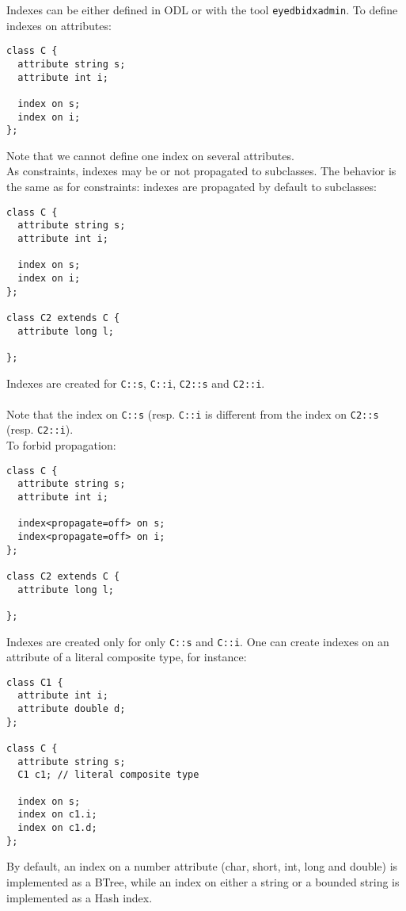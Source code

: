 Indexes can be either defined in ODL or with the tool \texttt{eyedbidxadmin}.
To define indexes on attributes:
\begin{verbatim}
class C {
  attribute string s;
  attribute int i;

  index on s;
  index on i;
};
\end{verbatim}
Note that we cannot define one index on several attributes.
\\
As constraints, indexes may be or not propagated to subclasses.
The behavior is the same as for constraints: indexes are propagated
by default to subclasses:
\begin{verbatim}
class C {
  attribute string s;
  attribute int i;

  index on s;
  index on i;
};

class C2 extends C {
  attribute long l;
  
};
\end{verbatim}
Indexes are created for \texttt{C::s}, \texttt{C::i}, \texttt{C2::s}
and \texttt{C2::i}.
\\
\\
Note that the index on \texttt{C::s} (resp. \texttt{C::i} is different from the
index on \texttt{C2::s} (resp. \texttt{C2::i}).
\\
To forbid propagation:
\begin{verbatim}
class C {
  attribute string s;
  attribute int i;

  index<propagate=off> on s;
  index<propagate=off> on i;
};

class C2 extends C {
  attribute long l;
  
};
\end{verbatim}
Indexes are created only for only \texttt{C::s} and \texttt{C::i}.
One can create indexes on an attribute of a literal composite type, for
instance:
\begin{verbatim}
class C1 {
  attribute int i;
  attribute double d;
};

class C {
  attribute string s;
  C1 c1; // literal composite type

  index on s;
  index on c1.i;
  index on c1.d;
};
\end{verbatim}
By default, an index on a number attribute (char, short, int, long and double)
is implemented as a BTree, while an index on either a string or a bounded string is
implemented as a Hash index.
\\
